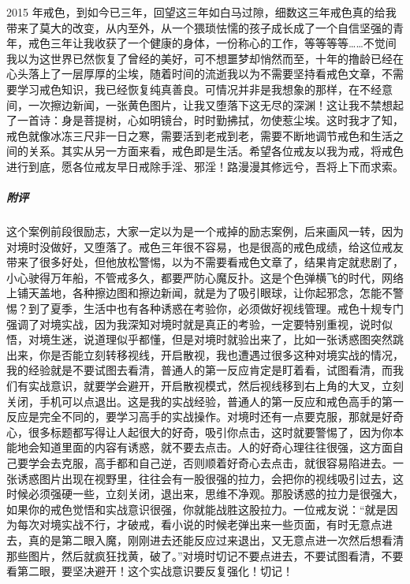 \begin{case}
    2015 年戒色，到如今已三年，回望这三年如白马过隙，细数这三年戒色真的给我带来了莫大的改变，从内至外，从一个猥琐怯懦的孩子成长成了一个自信坚强的青年，戒色三年让我收获了一个健康的身体，一份称心的工作，等等等等……不觉间我以为这世界已然恢复了曾经的美好，可不想噩梦却悄然而至，十年的撸龄已经在心头落上了一层厚厚的尘埃，随着时间的流逝我以为不需要坚持看戒色文章，不需要学习戒色知识，我已经恢复纯真善良。可情况并非是我想象的那样，在不经意间，一次擦边新闻，一张黄色图片，让我又堕落下这无尽的深渊！这让我不禁想起了一首诗：身是菩提树，心如明镜台，时时勤拂拭，勿使惹尘埃。这时我才了知，戒色就像冰冻三尺非一日之寒，需要活到老戒到老，需要不断地调节戒色和生活之间的关系。其实从另一方面来看，戒色即是生活。希望各位戒友以我为戒，将戒色进行到底，愿各位戒友早日戒除手淫、邪淫！路漫漫其修远兮，吾将上下而求索。
    \subparagraph{附评} 这个案例前段很励志，大家一定以为是一个戒掉的励志案例，后来画风一转，因为对境时没做好，又堕落了。戒色三年很不容易，也是很高的戒色成绩，给这位戒友带来了很多好处，但他放松警惕，以为不需要看戒色文章了，结果肯定就悲剧了，小心驶得万年船，不管戒多久，都要严防心魔反扑。这是个色弹横飞的时代，网络上铺天盖地，各种擦边图和擦边新闻，就是为了吸引眼球，让你起邪念，怎能不警惕？到了夏季，生活中也有各种诱惑在考验你，必须做好视线管理。戒色十规专门强调了对境实战，因为我深知对境时就是真正的考验，一定要特别重视，说时似悟，对境生迷，说道理似乎都懂，但是对境时就验出来了，比如一张诱惑图突然跳出来，你是否能立刻转移视线，开启散视，我也遭遇过很多这种对境实战的情况，我的经验就是不要试图去看清，普通人的第一反应肯定是盯着看，试图看清，而我们有实战意识，就要学会避开，开启散视模式，然后视线移到右上角的大叉，立刻关闭，手机可以点退出。这是我的实战经验，普通人的第一反应和戒色高手的第一反应是完全不同的，要学习高手的实战操作。对境时还有一点要克服，那就是好奇心，很多标题都写得让人起很大的好奇，吸引你点击，这时就要警惕了，因为你本能地会知道里面的内容有诱惑，就不要去点击。人的好奇心理往往很强，这方面自己要学会去克服，高手都和自己逆，否则顺着好奇心去点击，就很容易陷进去。一张诱惑图片出现在视野里，往往会有一股很强的拉力，会把你的视线吸引过去，这时候必须强硬一些，立刻关闭，退出来，思维不净观。那股诱惑的拉力是很强大，如果你的戒色觉悟和实战意识很强，你就能战胜这股拉力。一位戒友说：“就是因为每次对境实战不行，才破戒，看小说的时候老弹出来一些页面，有时无意点进去，真的是第二眼入魔，刚刚进去还能反应过来退出，又无意点进一次然后想看清那些图片，然后就疯狂找黄，破了。”对境时切记不要点进去，不要试图看清，不要看第二眼，要坚决避开！这个实战意识要反复强化！切记！


\end{case}
